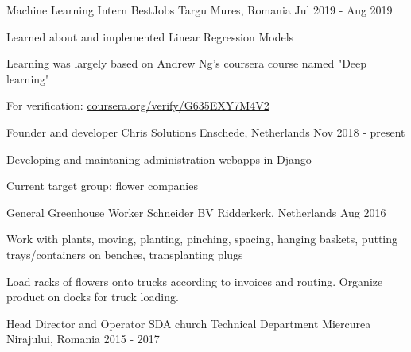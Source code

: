 
    \begin{cventries}
    
    \cventry
    {Machine Learning Intern}
    {BestJobs}
    {Targu Mures, Romania}
    {Jul 2019 - Aug 2019}
    {
        \begin{cvitems}
        \item {Learned about and implemented Linear Regression Models}
        \item {Learning was largely based on Andrew Ng's coursera course named "Deep learning"}
        \item {For verification: \url{coursera.org/verify/G635EXY7M4V2}}
        \end{cvitems}
    }

    \cventry
    {Founder and developer}
    {Chris Solutions}
    {Enschede, Netherlands}
    {Nov 2018 - present}
    {
        \begin{cvitems}
            \item {Developing and maintaning administration webapps in Django}
            \item {Current target group: flower companies}
        \end{cvitems}
    }

    \cventry
    {General Greenhouse Worker}
    {Schneider BV}
    {Ridderkerk, Netherlands}
    {Aug 2016}
    {
        \begin{cvitems}
            \item {Work with plants, moving, planting, pinching, spacing, hanging baskets, putting trays/containers on benches, transplanting plugs}
            \item {Load racks of flowers onto trucks according to invoices and routing. Organize product on docks for truck loading.}
        \end{cvitems}
    }

    \cventry
    {Head Director and Operator}
    {SDA church Technical Department}
    {Miercurea Nirajului, Romania}
    {2015 - 2017}
    {
    }

\end{cventries}
